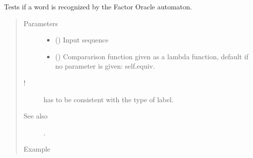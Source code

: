 \documentclass[letterpaper,10pt,english]{sphinxmanual}
\begin{document}
\begin{fulllineitems}
\begin{fulllineitems}
\end{fulllineitems}


\begin{fulllineitems}
\label{\detokenize{index:Model.FactorOracle.is_recognized}}
Tests if a word is recognized by the Factor Oracle automaton.
\begin{quote}\begin{description}
\item[{Parameters}] \leavevmode\begin{itemize}
\item {} 
 () \textendash{} Input sequence

\item {} 
 () \textendash{} Compararison function given as a lambda function, default if no parameter is given: self.equiv.

\end{itemize}

\item[{!}] \leavevmode
{} has to be consistent with the type of label.

\item[{See also}] \leavevmode
{} .

\item[{Example}] \leavevmode
\end{description}\end{quote}


\end{fulllineitems}
\end{fulllineitems}
\end{document}
